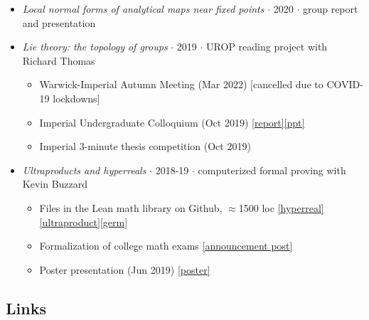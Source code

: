 \documentclass{article}
\begin{document}
\begin{itemize}
    \item \emph{Local normal forms of analytical maps near fixed points} $\cdot$ 2020 $\cdot$ group report and presentation
    
    \item \emph{Lie theory: the topology of groups} $\cdot$ 2019 $\cdot$ UROP reading project with Richard Thomas

    \begin{itemize}
        \item Warwick-Imperial Autumn Meeting (Mar 2022) [cancelled due to COVID-19 lockdowns] 
        \item Imperial Undergraduate Colloquium (Oct 2019) \href{https://drive.google.com/file/d/1F5ZrQmRhkpp7dWFbjHreB-4pX4uR80VX/view?usp=drive_link}{[report]}\href{https://drive.google.com/file/d/1BYsFoRl5F6DBN7ARMdc-I1TrIKJgMqgY/view?usp=drive_link}{[ppt]}
        \item Imperial 3-minute thesis competition (Oct 2019)
    \end{itemize}

    \item \emph{Ultraproducts and hyperreals} $\cdot$ 2018-19 $\cdot$ computerized formal proving with Kevin Buzzard

    \begin{itemize}
        \item Files in the Lean math library on Github, $\approx$1500 loc \href{https://github.com/leanprover-community/mathlib/blob/master/src/data/real/hyperreal.lean}{[hyperreal]}\href{https://github.com/leanprover-community/mathlib/blob/master/src/order/filter/filter_product.lean}{[ultraproduct]}\href{https://github.com/leanprover-community/mathlib/blob/master/src/order/filter/germ.lean}{[germ]}
        \item Formalization of college math exams \href{https://xenaproject.wordpress.com/2019/05/06/m1f-imperial-undergraduates-and-lean/}{[announcement post]}
        \item Poster presentation (Jun 2019) \href{https://drive.google.com/file/d/1FAx-c7pPaaKvjInDIQGr_gnhEnofc_vJ/view?usp=drive_link}{[poster]}
    \end{itemize}

\end{itemize}


\subsection*{Links}
\end{document}
